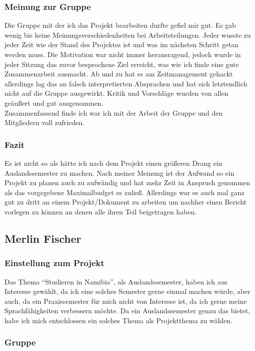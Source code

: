 \documentclass[11pt]{article}
\begin{document}
\subsubsection{Meinung zur Gruppe}
Die Gruppe mit der ich das Projekt bearbeiten durfte gefiel mir gut. Es gab wenig bis keine Meinungsverschiedenheiten bei Arbeitsteilungen. Jeder wusste zu jeder Zeit wie der Stand des Projektes ist und was im nächsten Schritt getan werden muss. Die Motivation war nicht immer herausragend, jedoch wurde in jeder Sitzung das zuvor besprochene Ziel erreicht, was wie ich finde eine gute Zusammenarbeit ausmacht. Ab und zu hat es am Zeitmanagement gehackt allerdings lag das an falsch interpretierten Absprachen und hat sich letztendlich nicht auf die Gruppe ausgewirkt. Kritik und Vorschläge wurden von allen geäußert und gut ausgenommen.
\\ Zusammenfassend finde ich war ich mit der Arbeit der Gruppe und den Mitgliedern voll zufrieden.

\subsubsection{Fazit}
Es ist nicht so als hätte ich nach dem Projekt einen größeren Drang ein Auslandssemester zu machen. Nach meiner Meinung ist der Aufwand so ein Projekt zu planen auch zu aufwändig und hat mehr Zeit in Anspruch genommen als das vorgegebene Maximalbudget es zuließ. Allerdings war es auch mal ganz gut zu dritt an einem Projekt/Dokument zu arbeiten um nachher einen Bericht vorlegen zu können an denen alle ihren Teil beigetragen haben.

\subsection{Merlin Fischer}
\subsubsection{Einstellung zum Projekt}

Das Thema "`Studieren in Namibia"', als Auslandssemester, haben ich aus Interesse gewählt, da ich eine solches Semester gerne einmal machen würde, aber auch, da ein Praxissemester für mich nicht von Interesse ist, da ich gerne meine Sprachfähigkeiten verbessern möchte.
Da ein Auslandssemester genau das bietet, habe ich mich entschlossen ein solches Thema als Projektthema zu wählen.

\subsubsection{Gruppe}
\end{document}
